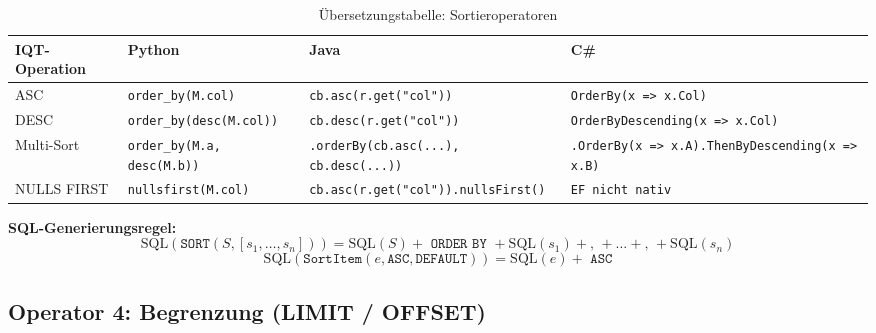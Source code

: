 \begin{table}
\centering
\caption{Übersetzungstabelle: Sortieroperatoren}
\label{tab:sort_ops}
\renewcommand{\arraystretch}{1.4}
\begin{tabularx}{\textwidth}{lXXX}
\toprule
\textbf{IQT-Operation} & \textbf{Python} & \textbf{Java} & \textbf{C\#} \\
\midrule
ASC
  & \texttt{order\_by(M.col)}
  & \texttt{cb.asc(r.get("col"))}
  & \texttt{OrderBy(x => x.Col)} \\
DESC
  & \texttt{order\_by(desc(M.col))}
  & \texttt{cb.desc(r.get("col"))}
  & \texttt{OrderByDescending(x => x.Col)} \\
Multi-Sort
  & \texttt{order\_by(M.a, desc(M.b))}
  & \texttt{.orderBy(cb.asc(...), cb.desc(...))}
  & \texttt{.OrderBy(x => x.A).ThenByDescending(x => x.B)} \\
NULLS FIRST
  & \texttt{nullsfirst(M.col)}
  & \texttt{cb.asc(r.get("col")).nullsFirst()}
  & \texttt{EF nicht nativ} \\
\bottomrule
\end{tabularx}
\end{table}

\textbf{SQL-Generierungsregel:}
\[
\mathrm{SQL}(\mathtt{SORT}(S, [s_1, \ldots, s_n])) =
  \mathrm{SQL}(S) + \texttt{ ORDER BY } +
  \mathrm{SQL}(s_1) + \texttt{, } + \ldots + \texttt{, } + \mathrm{SQL}(s_n)
\]
\[
\mathrm{SQL}(\mathtt{SortItem}(e, \mathtt{ASC}, \mathtt{DEFAULT})) =
  \mathrm{SQL}(e) + \texttt{ ASC}
\]

\subsection{Operator 4: Begrenzung (LIMIT / OFFSET)}
\label{subsec:op_limit}

